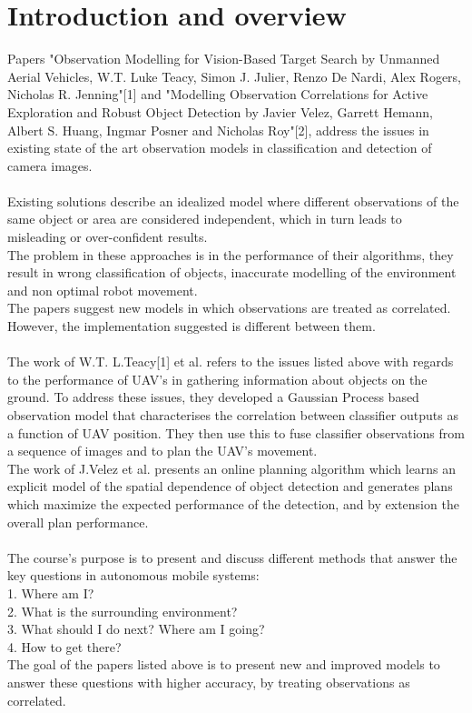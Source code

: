 \documentclass{article}
\begin{document}
	\section{Introduction and overview}
	Papers "Observation Modelling for Vision-Based Target Search by Unmanned Aerial Vehicles, W.T. Luke Teacy, Simon J. Julier, Renzo De Nardi, Alex Rogers, Nicholas R. Jenning"[1] and "Modelling Observation Correlations for Active Exploration and Robust Object Detection by Javier Velez, Garrett Hemann, Albert S. Huang, Ingmar Posner and Nicholas Roy"[2], address the issues in existing state of the art observation models in classification and detection of camera images. \\ \\
	Existing solutions describe an idealized model where different observations of the same object or area are considered independent, which in turn leads to misleading or over-confident results. \\
	The problem in these approaches is in the performance of their algorithms, they result in wrong classification of objects, inaccurate modelling of the environment and non optimal robot movement. \\
	The papers suggest new models in which observations are treated as correlated. However, the implementation suggested is different between them. \\ \\
	The work of W.T. L.Teacy[1] et al. refers to the issues listed above with regards to the performance of UAV's in gathering information about objects on the ground. To address these issues, they developed a Gaussian Process based observation model that characterises the correlation between classifier outputs as a function of UAV position. They then use this to fuse classifier observations from a sequence of images and to plan the UAV's movement. \\
	The work of J.Velez et al. presents an online planning algorithm which learns an explicit model of the spatial dependence of object detection and generates plans which maximize the expected performance of the detection, and by extension the overall plan performance. \\ \\	
	The course's purpose is to present and discuss different methods that answer the key questions in autonomous mobile systems: \\
	1. Where am I? \\
	2. What is the surrounding environment?\\
	3. What should I do next? Where am I going?\\
	4. How to get there?\\
	The goal of the papers listed above is to present new and improved models to answer these questions with higher accuracy, by treating observations as correlated. \\ \\
	
\end{document}
